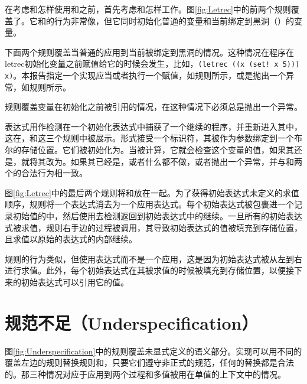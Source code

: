 在考虑和怎样使用和之前，首先考虑和怎样工作。图\ref{fig:Letrec}中的前两个规则覆盖了。它和的行为非常像，但它同时初始化普通的变量和当前绑定到黑洞（）的变量。

下面两个规则覆盖当普通的应用到当前被绑定到黑洞的情况。这种情况在程序在letrec初始化变量之前赋值给它的时候会发生，比如，\verb|(letrec ((x (set! x 5))) x)|。本报告指定一个实现应当或者执行一个赋值，如规则所示，或是抛出一个异常，如规则所示。

规则覆盖变量在初始化之前被引用的情况，在这种情况下必须总是抛出一个异常。

表达式用作检测在一个初始化表达式中捕获了一个继续的程序，并重新进入其中，这在，和这三个规则中被展示。形式接受一个标识符，其被作为参数绑定到一个布尔的存储位置。它们被初始化为\semfalse{}。当被计算，它就会检查这个变量的值，如果其还是\semfalse{}，就将其改为\semtrue{}。如果其已经是\semtrue{}，或者什么都不做，或者抛出一个异常，并与和两个的合法行为相一致。

图\ref{fig:Letrec}中的最后两个规则将和放在一起。为了获得初始表达式未定义的求值顺序，规则将一个表达式消去为一个应用表达式。每个初始表达式被包裹进一个记录初始值的中，然后使用去检测返回到初始表达式中的继续。一旦所有的初始表达式被求值，规则右手边的过程被调用，其导致初始表达式的值被填充到存储位置，且求值以原始的表达式的内部继续。

规则的行为类似，但使用表达式而不是一个应用，这是因为初始表达式被从左到右进行求值。此外，每个初始表达式在其被求值的时候被填充到存储位置，以便接下来的初始表达式可以引用它的值。

\section{规范不足（Underspecification）}\label{sec:semantics:underspecification}

\beginfig
\begin{center}

\end{center}
\caption{显式未定义的行为}\label{fig:Underspecification}
\endfig

图\ref{fig:Underspecification}中的规则覆盖未显式定义的语义部分。实现可以用不同的覆盖左边的规则替换规则和，只要它们遵守非正式的规范，任何的替换都是合法的。那三种情况对应于应用到两个过程和多值被用在单值的上下文中的情况。

